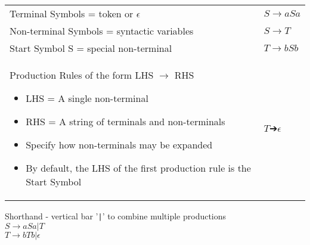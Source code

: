 \documentclass[10pt,landscape]{article}
\begin{document}
\begin{multicols}{3}
\begin{tabular}{p{}l}
            Terminal Symbols = token or $\epsilon$ & $S \rightarrow a S a$ \\
            Non-terminal Symbols = syntactic variables  & $S \rightarrow  T $\\
            Start Symbol S = special non-terminal  &  $T \rightarrow b S b $ \\
           Production Rules of the form LHS $\rightarrow$ RHS \begin{itemize}
            \item LHS = A single non-terminal 
            \item RHS = A string of terminals and non-terminals
            \item Specify how non-terminals may be expanded
            \item By default, the LHS of the first production rule is the Start Symbol
            \end{itemize} & $ T ➔ \epsilon$
            
          \end{tabular}
Shorthand - vertical bar '\verb!|!' to combine multiple productions \\
$S \rightarrow a S a | T $ \\
$T \rightarrow b T b | \epsilon $\\

\end{multicols}
\end{document}
